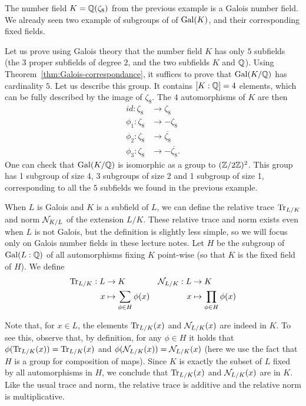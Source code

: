 \begin{example}
The number field $K = \mathbb{Q}(\zeta_8)$ from the previous example is a Galois number field. We already seen two example of subgroups of of $\operatorname{Gal}(K)$, and their corresponding fixed fields.

Let us prove using Galois theory that the number field $K$ has only $5$ subfields (the $3$ proper subfields of degree $2$, and the two subfields $K$ and $\mathbb{Q}$). Using Theorem~\ref{thm:Galois-correspondance}, it suffices to prove that $\operatorname{Gal}(K/\mathbb{Q})$ has cardinality $5$. Let us describe this group. It contains $[K:\mathbb{Q}] = 4$ elements, which can be fully described by the image of $\zeta_8$. The $4$ automorphisms of $K$ are then
\begin{align*}
id: \zeta_8 &\rightarrow \zeta_8 \\
\phi_1: \zeta_8 &\rightarrow -\zeta_8 \\
\phi_2: \zeta_8 &\rightarrow \overline{\zeta_8} \\
\phi_3: \zeta_8 &\rightarrow -\overline{\zeta_8}.
\end{align*}
One can check that $\operatorname{Gal}(K/\mathbb{Q})$ is isomorphic as a group to $(\mathbb{Z}/2\mathbb{Z})^2$. This group has 1 subgroup of size 4, 3 subgroups of size 2 and 1 subgroup of size 1, corresponding to all the $5$ subfields we found in the previous example.
\end{example}

When $L$ is Galois and $K$ is a subfield of $L$, we can define the relative trace $\mathrm{Tr}_{L/K}$ and norm $\mathcal{N}_{K/L}$ of the extension $L/K$. These relative trace and norm exists even when $L$ is not Galois, but the definition is slightly less simple, so we will focus only on Galois number fields in these lecture notes. Let $H$ be the subgroup of $\operatorname{Gal}(L:\mathbb{Q})$ of all automorphisms fixing $K$ point-wise (so that $K$ is the fixed field of $H$). We define
\begin{align*}
\mathrm{Tr}_{L/K}: L &\rightarrow K  & \mathcal{N}_{L/K}: L &\rightarrow K\\
x &\mapsto \sum_{\phi \in H} \phi(x)  & x &\mapsto \prod_{\phi \in H} \phi(x)\\
\end{align*}

Note that, for $x \in L$, the elements $\mathrm{Tr}_{L/K}(x)$ and $\mathcal{N}_{L/K}(x)$ are indeed in $K$. To see this, observe that, by definition, for any $\phi \in H$ it holds that $\phi(\mathrm{Tr}_{L/K}(x)) = \mathrm{Tr}_{L/K}(x)$ and $\phi(\mathcal{N}_{L/K}(x)) = \mathcal{N}_{L/K}(x)$ (here we use the fact that $H$ is a group for composition of maps). Since $K$ is exactly the subset of $L$ fixed by all automorphisms in $H$, we conclude that $\mathrm{Tr}_{L/K}(x)$ and $\mathcal{N}_{L/K}(x)$ are in $K$. Like the usual trace and norm, the relative trace is additive and the relative norm is multiplicative.

